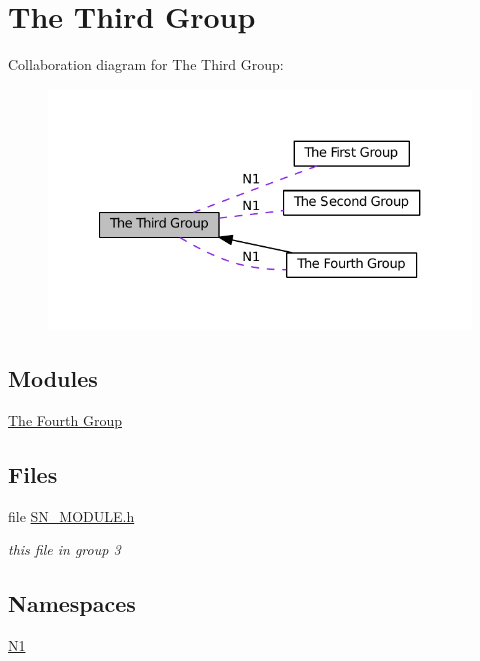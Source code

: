 \hypertarget{group__group3}{}\section{The Third Group}
\label{group__group3}
Collaboration diagram for The Third Group\+:
\nopagebreak
\begin{figure}[H]
\begin{center}
\leavevmode
\includegraphics[width=327pt]{group__group3}
\end{center}
\end{figure}
\subsection*{Modules}
\begin{DoxyCompactItemize}
\item 
\hyperlink{group__group4}{The Fourth Group}
\end{DoxyCompactItemize}
\subsection*{Files}
\begin{DoxyCompactItemize}
\item 
file \hyperlink{SN__MODULE_8h}{S\+N\+\_\+\+M\+O\+D\+U\+L\+E.\+h}
\begin{DoxyCompactList}\small\item\em this file in group 3 \end{DoxyCompactList}\end{DoxyCompactItemize}
\subsection*{Namespaces}
\begin{DoxyCompactItemize}
\item 
 \hyperlink{namespaceN1}{N1}
\end{DoxyCompactItemize}
